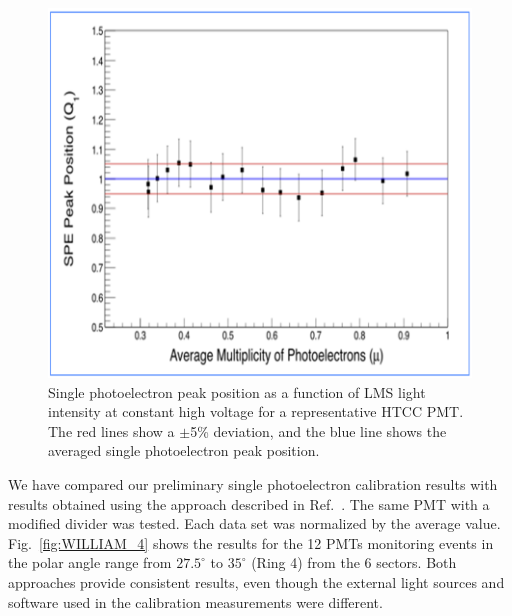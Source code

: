 \begin{figure}[ht]
\centering
\includegraphics[width=0.99\linewidth]{images/WILLIAM_5.png}
\caption{Single photoelectron peak position as a function of LMS light intensity at constant high voltage for a
  representative HTCC PMT. The red lines show a $\pm$5\% deviation, and the blue line shows the averaged
  single photoelectron peak position.}
\label{fig:WILLIAM_5}
\end{figure}


We have compared our preliminary single photoelectron calibration results with results obtained using the
approach described in Ref.~\cite{degtiarenko2017}. The same PMT with a modified divider was tested. Each data
set was normalized by the average value. Fig.~\ref{fig:WILLIAM_4} shows the results for the 12 PMTs monitoring
events in the polar angle range from $27.5^\circ$ to $35^\circ$ (Ring 4) from the 6 sectors. Both approaches
provide consistent results, even though the external light sources and software used in the calibration measurements
were different.

